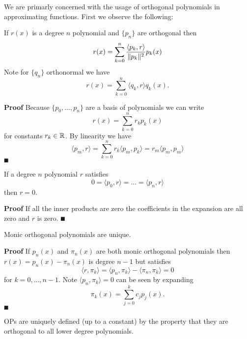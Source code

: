 We are primarly concerned with the usage of orthogonal polynomials in approximating functions. First we observe the following:

\begin{proposition}[expansion] If $r(x)$ is a degree $n$ polynomial and $\{p_n\}$ are orthogonal then
\[
r(x) = \ensuremath{\sum}_{k=0}^n {\ensuremath{\langle}p_k,r\ensuremath{\rangle} \over \|p_k\|^2} p_k(x)
\]
Note for $\{q_n\}$ orthonormal we have
\[
r(x) = \ensuremath{\sum}_{k=0}^n \ensuremath{\langle}q_k,r\ensuremath{\rangle} q_k(x).
\]
\end{proposition}
\textbf{Proof} Because $\{p_0,\ensuremath{\ldots},p_n \}$ are a basis of polynomials we can write
\[
r(x) = \ensuremath{\sum}_{k=0}^n r_k p_k(x)
\]
for constants $r_k \in {\mathbb R}$. By linearity we have
\[
\ensuremath{\langle}p_m,r\ensuremath{\rangle} = \ensuremath{\sum}_{k=0}^n r_k \ensuremath{\langle}p_m,p_k\ensuremath{\rangle}= r_m \ensuremath{\langle}p_m,p_m\ensuremath{\rangle}
\]
\ensuremath{\QED}

\begin{corollary} If a degree $n$ polynomial $r$ satisfies
\[
0 = \ensuremath{\langle}p_0,r\ensuremath{\rangle} = \ensuremath{\ldots} = \ensuremath{\langle}p_n,r\ensuremath{\rangle}
\]
then $r = 0$.

\end{corollary}
\textbf{Proof} If all the inner products are zero the coefficients in the expansion are all zero and $r$ is zero. \ensuremath{\QED}

\begin{corollary}[uniqueness] Monic orthogonal polynomials are unique.

\end{corollary}
\textbf{Proof} If $p_n(x)$ and $\ensuremath{\pi}_n(x)$ are both monic orthogonal polynomials then $r(x) = p_n(x) - \ensuremath{\pi}_n(x)$ is degree $n-1$ but satisfies
\[
\ensuremath{\langle}r, \ensuremath{\pi}_k\ensuremath{\rangle} = \ensuremath{\langle}p_n, \ensuremath{\pi}_k\ensuremath{\rangle} - \ensuremath{\langle}\ensuremath{\pi}_n, \ensuremath{\pi}_k\ensuremath{\rangle} = 0
\]
for $k = 0,\ensuremath{\ldots},{n-1}$. Note $\ensuremath{\langle}p_n, \ensuremath{\pi}_k\ensuremath{\rangle} = 0$ can be seen by expanding
\[
\ensuremath{\pi}_k(x) = \ensuremath{\sum}_{j=0}^k c_j p_j(x).
\]
\ensuremath{\QED}

OPs are uniquely defined (up to a constant) by the property that they are orthogonal to all lower degree polynomials.


